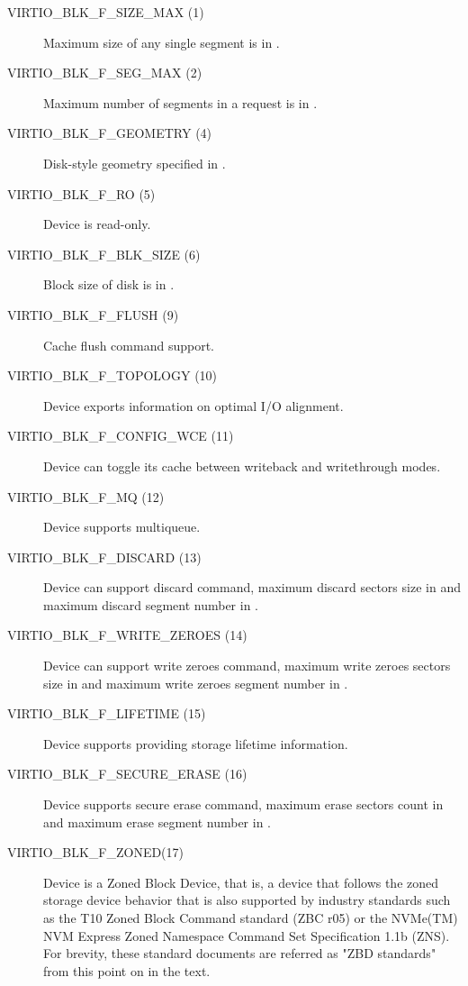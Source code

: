 \begin{description}
\item[VIRTIO_BLK_F_SIZE_MAX (1)] Maximum size of any single segment is
    in .

\item[VIRTIO_BLK_F_SEG_MAX (2)] Maximum number of segments in a
    request is in .

\item[VIRTIO_BLK_F_GEOMETRY (4)] Disk-style geometry specified in
    .

\item[VIRTIO_BLK_F_RO (5)] Device is read-only.

\item[VIRTIO_BLK_F_BLK_SIZE (6)] Block size of disk is in .

\item[VIRTIO_BLK_F_FLUSH (9)] Cache flush command support.

\item[VIRTIO_BLK_F_TOPOLOGY (10)] Device exports information on optimal I/O
    alignment.

\item[VIRTIO_BLK_F_CONFIG_WCE (11)] Device can toggle its cache between writeback
    and writethrough modes.

\item[VIRTIO_BLK_F_MQ (12)] Device supports multiqueue.

\item[VIRTIO_BLK_F_DISCARD (13)] Device can support discard command, maximum
    discard sectors size in  and maximum discard
    segment number in .

\item[VIRTIO_BLK_F_WRITE_ZEROES (14)] Device can support write zeroes command,
     maximum write zeroes sectors size in  and
     maximum write zeroes segment number in .

\item[VIRTIO_BLK_F_LIFETIME (15)] Device supports providing storage lifetime
     information.

\item[VIRTIO_BLK_F_SECURE_ERASE (16)] Device supports secure erase command,
     maximum erase sectors count in  and
     maximum erase segment number in .

\item[VIRTIO_BLK_F_ZONED(17)] Device is a Zoned Block Device, that is, a device
	that follows the zoned storage device behavior that is also supported by
	industry standards such as the T10 Zoned Block Command standard (ZBC r05) or
	the NVMe(TM) NVM Express Zoned Namespace Command Set Specification 1.1b
	(ZNS). For brevity, these standard documents are referred as "ZBD standards"
	from this point on in the text.


\end{description}
